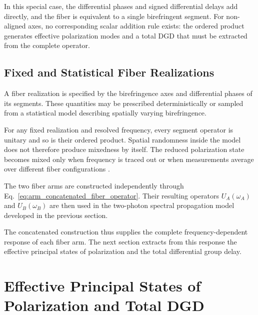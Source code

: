 In this special case, the differential phases and signed differential delays
add directly, and the fiber is equivalent to a single birefringent segment.
For non-aligned axes, no corresponding scalar addition rule exists: the
ordered product generates effective polarization modes and a total DGD that
must be extracted from the complete operator.


\subsection{Fixed and Statistical Fiber Realizations}
\label{subsec:fixed_and_statistical_fiber_realizations}

A fiber realization is specified by the birefringence axes and differential
phases of its segments. These quantities may be prescribed deterministically
or sampled from a statistical model describing spatially varying
birefringence.

For any fixed realization and resolved frequency, every segment operator is
unitary and so is their ordered product. Spatial randomness inside the model
does not therefore produce mixedness by itself. The reduced polarization
state becomes mixed only when frequency is traced out or when measurements
average over different fiber configurations
\cite{wai_menyuk_random_birefringence_1996,
poon_law_stochastic_pmd_2008}.

The two fiber arms are constructed independently through
Eq.~\eqref{eq:arm_concatenated_fiber_operator}. Their resulting operators
\(U_A(\omega_A)\) and \(U_B(\omega_B)\) are then used in the two-photon
spectral propagation model developed in the previous section.

The concatenated construction thus supplies the complete
frequency-dependent response of each fiber arm. The next section extracts
from this response the effective principal states of polarization and the
total differential group delay.


\section{Effective Principal States of Polarization and Total DGD}
\label{sec:effective_psp_and_total_dgd}

